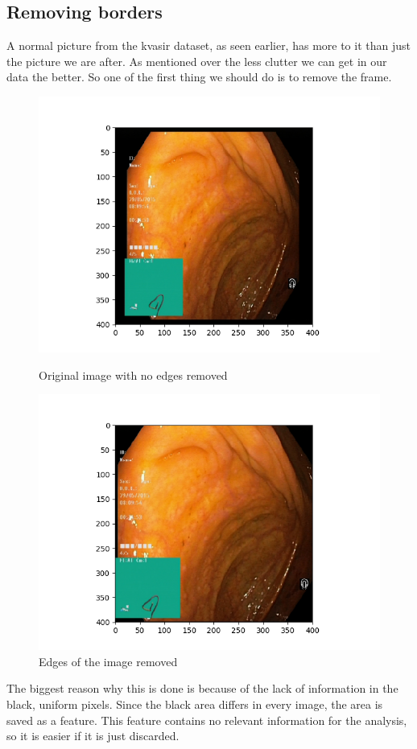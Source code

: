 
  
  \subsection{Removing borders}
    A normal picture from the kvasir dataset, as seen earlier, has more to it than just the picture we are after.
    As mentioned over the less clutter we can get in our data the better. So one of the first thing we should do is to remove the frame.
    \begin{figure}[ht]
      \centering
      \begin{minipage}[b]{0.45\textwidth}
	\includegraphics[width=\textwidth]{methods/figures/No_crop.png}
	\caption{Original image with no edges removed}
      \end{minipage}
      \hfill
      \begin{minipage}[b]{0.45\textwidth}
	\includegraphics[width=\textwidth]{methods/figures/Crop.png}
	\caption{Edges of the image removed}
      \end{minipage}
    \end{figure}
    The biggest reason why this is done is because of the lack of information in the black, uniform pixels. Since the 
    black area differs in every image, the area is saved as a feature. This feature contains no relevant information for the analysis,
    so it is easier if it is just discarded. \\
    
